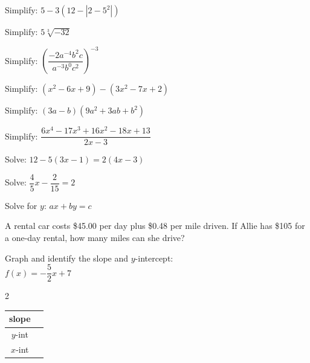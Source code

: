 \documentclass[addpoints,12pt,answers]{exam}
\begin{document}
\begin{questions}

\question[5] Simplify: $5-3(12-|2-5^2|)$
\answerline

\question[5] Simplify: $5\sqrt[3]{-32}$
\answerline

\question[5] Simplify: $\left(\dfrac{-2a^{-4}b^2c}{a^{-3}b^0c^2}\right)^{-3}$
\answerline

\newpage

\question[5] Simplify: $(x^2-6x+9)-(3x^2-7x+2)$
\answerline

\question[5] Simplify: $(3a-b)(9a^2+3ab+b^2)$
\answerline

\question[5] Simplify: $\dfrac{6x^4-17x^3+16x^2-18x+13}{2x-3}$
\answerline

\newpage

\question[5] Solve: $12-5(3x-1)=2(4x-3)$
\answerline

\question[5] Solve: $\dfrac{4}{5}x-\dfrac{2}{15}=2$
\answerline

\question[5] Solve for $y$: $ax+by=c$
\answerline

\newpage

\question[5] A rental car costs \$45.00 per day plus \$0.48 per mile driven. If Allie has \$105 for a one-day rental, how many miles can she drive?
\answerline


\question[5] Graph and identify the slope and $y$-intercept: \\

$f(x)=-\dfrac{5}{2}x+7$

\begin{multicols}{2}
{\renewcommand{\arraystretch}{2.5}%
\begin{tabular}{|c|p{1.5in}|}\hline
    slope &  \\ \hline
    $y$-int &  \\ \hline
    $x$-int & \\ \hline
\end{tabular}}


\end{multicols}
\end{questions}
\end{document}
